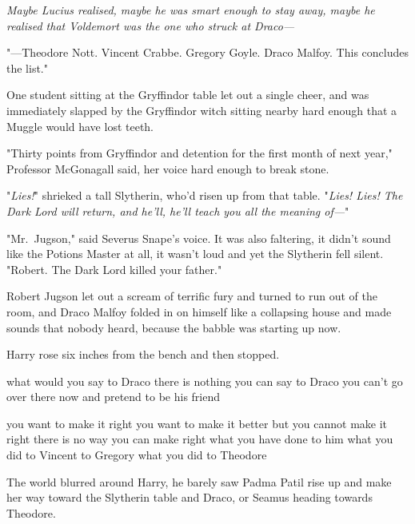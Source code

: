 \emph{Maybe Lucius realised, maybe he was smart enough to stay away, maybe he
realised that Voldemort was the one who struck at Draco---}

"---Theodore Nott. Vincent Crabbe. Gregory Goyle. Draco Malfoy. This concludes
the list."

One student sitting at the Gryffindor table let out a single cheer, and was
immediately slapped by the Gryffindor witch sitting nearby hard enough that a
Muggle would have lost teeth.

"Thirty points from Gryffindor and detention for the first month of next year,"
Professor McGonagall said, her voice hard enough to break stone.

"\emph{Lies!}" shrieked a tall Slytherin, who'd risen up from that table.
"\emph{Lies! Lies! The Dark Lord will return, and he'll, he'll teach you all
the meaning of---}"

"Mr.~Jugson," said Severus Snape's voice. It was also faltering, it didn't
sound like the Potions Master at all, it wasn't loud and yet the Slytherin fell
silent. "Robert. The Dark Lord killed your father."

Robert Jugson let out a scream of terrific fury and turned to run out of the
room, and Draco Malfoy folded in on himself like a collapsing house and made
sounds that nobody heard, because the babble was starting up now.

Harry rose six inches from the bench and then stopped.

what would you say to Draco there is nothing you can say to Draco you can't go
over there now and pretend to be his friend

you want to make it right you want to make it better but you cannot make it
right there is no way you can make right what you have done to him what you did
to Vincent to Gregory what you did to Theodore

The world blurred around Harry, he barely saw Padma Patil rise up and make her
way toward the Slytherin table and Draco, or Seamus heading towards Theodore.

